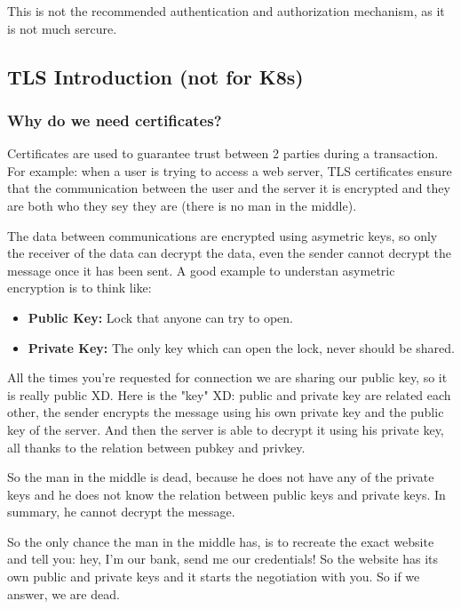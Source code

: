 \documentclass{article}
\newenvironment{blocktemplateIII}[1]{%
    \tcolorbox[beamer,%
    noparskip,breakable,
    ,colframe=Red,%
    colbacklower=LimeGreen!75!LightGreen,%
    title=#1]}%
    {\endtcolorbox}
\begin{document}
\begin{blocktemplateIII}{WARNING}
This is not the recommended authentication and authorization mechanism, as it is not much sercure.
\end{blocktemplateIII}

\subsection{TLS Introduction (not for K8s)}

\subsubsection{Why do we need certificates?}
Certificates are used to guarantee trust between 2 parties during a transaction. For example: when a user is trying to access a web server, TLS certificates ensure that the communication between the user and the server it is encrypted and they are both who they sey they are (there is no man in the middle).

The data between communications are encrypted using asymetric keys, so only the receiver of the data can decrypt the data, even the sender cannot decrypt the message once it has been sent. A good example to understan asymetric encryption is to think like:
\begin{itemize}
    \item \textbf{Public Key:} Lock that anyone can try to open.
    \item \textbf{Private Key:} The only key which can open the lock, never should be shared.
\end{itemize}

All the times you're requested for connection we are sharing our public key, 
so it is really public XD. Here is the "key" XD: public and private key are related each other,
the sender encrypts the message using his own private key and the public key of the server. And then the server is able to
decrypt it using his private key, all thanks to the relation between pubkey and privkey. 

So the man in the middle is dead, because he does not have any of the private keys and he does not know the relation between public keys and private keys. In summary, he cannot decrypt the message.

So the only chance the man in the middle has, is to recreate the exact website and tell you: hey, I'm our bank, send me our credentials! So the website has its own public and private keys and it starts the negotiation with you. So if we answer, we are dead.
\end{document}

